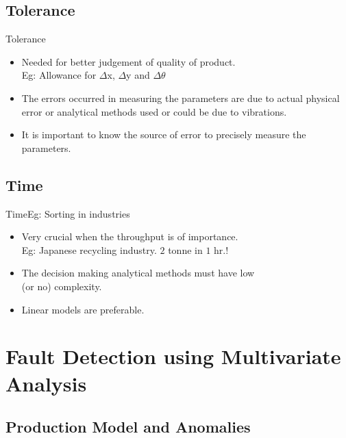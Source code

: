 \documentclass{beamer}
\begin{document}
\subsection{Tolerance}

\begin{frame}{Tolerance}
  \begin{itemize}
  \item Needed for better judgement of quality of product.\\
  Eg: Allowance for $\Delta$x, $\Delta$y and $\Delta\theta$
  \item The errors occurred in measuring the parameters are due to actual physical error or analytical methods used or could be due to vibrations.
  \item It is important to know the source of error to precisely measure the parameters.
  \end{itemize}
\end{frame}

\subsection{Time}

\begin{frame}{Time}{Eg: Sorting in industries}
  \begin{itemize}
  \item Very crucial when the throughput is of importance.\\
  Eg: Japanese recycling industry. $2$ tonne in $1$ hr.!
  \item The decision making analytical methods must have low \\
  (or no) complexity.
  \item Linear models are preferable.
  \end{itemize}
\end{frame}


\section{Fault Detection using Multivariate Analysis}

\subsection{Production Model and Anomalies}
\end{document}
